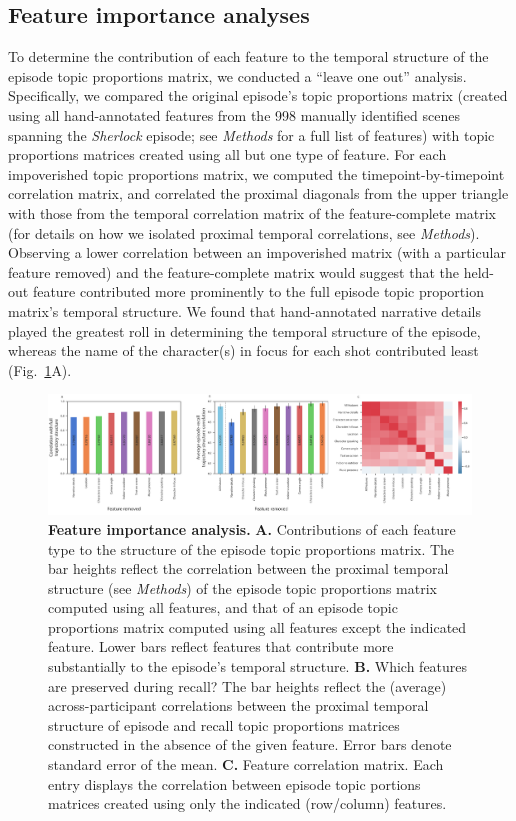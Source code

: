 \documentclass{article}
\begin{document}
\subsection*{Feature importance analyses}
To determine the contribution of each feature to the temporal structure of the episode topic proportions matrix, we conducted a ``leave one out'' analysis.  Specifically, we compared the original episode's topic proportions matrix (created using all hand-annotated features from the 998 manually identified scenes spanning the \textit{Sherlock} episode; see \textit{Methods} for a full list of features) with topic proportions matrices created using all but one type of feature.  For each impoverished topic proportions matrix, we computed the timepoint-by-timepoint correlation matrix, and correlated the proximal diagonals from the upper triangle with those from the temporal correlation matrix of the feature-complete matrix (for details on how we isolated proximal temporal correlations, see \textit{Methods}).  Observing a lower correlation between an impoverished matrix (with a particular feature removed) and the feature-complete matrix would suggest that the held-out feature contributed more prominently to the full episode topic proportion matrix's temporal structure.  We found that hand-annotated narrative details played the greatest roll in determining the temporal structure of the episode, whereas the name of the character(s) in focus for each shot contributed least (Fig.~\ref{fig:feature-importance}A).

\begin{figure}[]
\centering
\includegraphics[width=1\textwidth]{figs/feature_value}
\caption{\small \textbf{Feature importance analysis.} \textbf{A.} Contributions of each feature type to the structure of the episode topic proportions matrix. The bar heights reflect the correlation between the proximal temporal structure (see \textit{Methods}) of the episode topic proportions matrix computed using all features, and that of an episode topic proportions matrix computed using all features except the indicated feature.  Lower bars reflect features that contribute more substantially to the episode's temporal structure. \textbf{B.} Which features are preserved during recall?  The bar heights reflect the (average) across-participant correlations between the proximal temporal structure of episode and recall topic proportions matrices constructed in the absence of the given feature.  Error bars denote standard error of the mean.  \textbf{C.} Feature correlation matrix.  Each entry displays the correlation between episode topic portions matrices created using only the indicated (row/column) features.}
\label{fig:feature-importance}
\end{figure}
\end{document}
